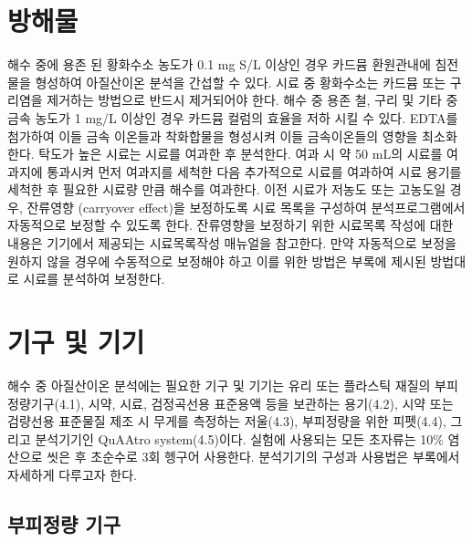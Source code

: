 \documentclass[
]{book}
\begin{document}
\hypertarget{uxbc29uxd574uxbb3c}{%
\section{방해물}\label{uxbc29uxd574uxbb3c}}

해수 중에 용존 된 황화수소 농도가 0.1 mg S/L 이상인 경우 카드뮴 환원관내에 침전물을 형성하여 아질산이온 분석을 간섭할 수 있다. 시료 중 황화수소는 카드뮴 또는 구리염을 제거하는 방법으로 반드시 제거되어야 한다.
해수 중 용존 철, 구리 및 기타 중금속 농도가 1 mg/L 이상인 경우 카드뮴 컬럼의 효율을 저하 시킬 수 있다. EDTA를 첨가하여 이들 금속 이온들과 착화합물을 형성시켜 이들 금속이온들의 영향을 최소화한다.
탁도가 높은 시료는 시료를 여과한 후 분석한다. 여과 시 약 50 mL의 시료를 여과지에 통과시켜 먼저 여과지를 세척한 다음 추가적으로 시료를 여과하여 시료 용기를 세척한 후 필요한 시료량 만큼 해수를 여과한다.
이전 시료가 저농도 또는 고농도일 경우, 잔류영향 (carryover effect)을 보정하도록 시료 목록을 구성하여 분석프로그램에서 자동적으로 보정할 수 있도록 한다. 잔류영향을 보정하기 위한 시료목록 작성에 대한 내용은 기기에서 제공되는 시료목록작성 매뉴얼을 참고한다. 만약 자동적으로 보정을 원하지 않을 경우에 수동적으로 보정해야 하고 이를 위한 방법은 부록에 제시된 방법대로 시료를 분석하여 보정한다.

\hypertarget{uxae30uxad6c-uxbc0f-uxae30uxae30}{%
\section{기구 및 기기}\label{uxae30uxad6c-uxbc0f-uxae30uxae30}}

해수 중 아질산이온 분석에는 필요한 기구 및 기기는 유리 또는 플라스틱 재질의 부피정량기구(4.1), 시약, 시료, 검정곡선용 표준용액 등을 보관하는 용기(4.2), 시약 또는 검량선용 표준물질 제조 시 무게를 측정하는 저울(4.3), 부피정량을 위한 피펫(4.4), 그리고 분석기기인 QuAAtro system(4.5)이다. 실험에 사용되는 모든 초자류는 10\% 염산으로 씻은 후 초순수로 3회 헹구어 사용한다. 분석기기의 구성과 사용법은 부록에서 자세하게 다루고자 한다.

\hypertarget{uxbd80uxd53cuxc815uxb7c9-uxae30uxad6c}{%
\subsection{부피정량 기구}\label{uxbd80uxd53cuxc815uxb7c9-uxae30uxad6c}}
\end{document}
